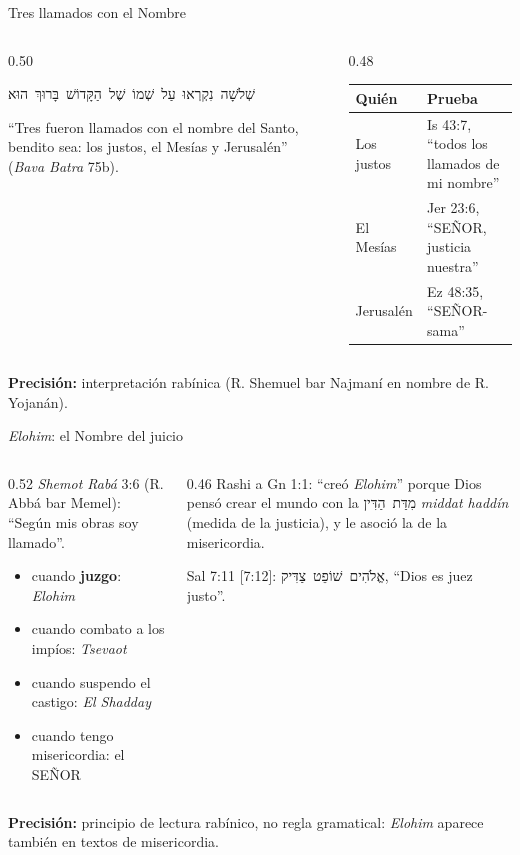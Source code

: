 \documentclass[hyperref={bookmarks=false},aspectratio=169]{beamer}
\newcommand{\heb}[1]{\mbox{\foreignlanguage{hebrew}{#1}}}
\newcommand{\SENOR}{S{\fontsize{0.78em}{1em}\selectfont EÑOR}}
\newcommand{\destacar}[1]{\textbf{\textcolor{azul}{#1}}}
\newcommand{\precision}[1]{{\footnotesize\color{gris}\textbf{Precisión:} #1}}
\begin{document}
\begin{frame}{Tres llamados con el Nombre}
\begin{columns}[c,onlytextwidth]
\begin{column}{0.50\textwidth}\small
\begin{center}\heb{שְׁלֹשָׁה נִקְרְאוּ עַל שְׁמוֹ שֶׁל הַקָּדוֹשׁ בָּרוּךְ הוּא}\end{center}
``Tres fueron llamados con el nombre del Santo, bendito sea: los justos, el Mesías y Jerusalén'' (\emph{Bava Batra} 75b).
\end{column}
\begin{column}{0.48\textwidth}
\scriptsize\renewcommand{\arraystretch}{1.2}
\begin{tabular}{@{}>{\RaggedRight\arraybackslash}p{1.6cm}>{\RaggedRight\arraybackslash}p{3.6cm}@{}}
\toprule
\textbf{Quién} & \textbf{Prueba} \\ \midrule
Los justos & Is 43:7, ``todos los llamados de mi nombre'' \\
El Mesías & Jer 23:6, ``\SENOR, justicia nuestra'' \\
Jerusalén & Ez 48:35, ``\SENOR-sama'' \\
\bottomrule
\end{tabular}
\end{column}
\end{columns}\par\medskip
\precision{interpretación rabínica (R. Shemuel bar Najmaní en nombre de R. Yojanán).}
\end{frame}

\begin{frame}{\emph{Elohim}: el Nombre del juicio}
\begin{columns}[c,onlytextwidth]
\begin{column}{0.52\textwidth}\small
\emph{Shemot Rabá} 3:6 (R. Abbá bar Memel): ``Según mis obras soy llamado''.
\begin{itemize}
\item cuando \destacar{juzgo}: \emph{Elohim}
\item cuando combato a los impíos: \emph{Tsevaot}
\item cuando suspendo el castigo: \emph{El Shadday}
\item cuando tengo misericordia: el \SENOR
\end{itemize}
\end{column}
\begin{column}{0.46\textwidth}\small
Rashi a Gn 1:1: ``creó \emph{Elohim}'' porque Dios pensó crear el mundo con la \heb{מִדַּת הַדִּין} \emph{middat haddín} (medida de la justicia), y le asoció la de la misericordia.\par\medskip
Sal 7:11 [7:12]: \heb{אֱלֹהִים שׁוֹפֵט צַדִּיק}, ``Dios es juez justo''.
\end{column}
\end{columns}\par\medskip
\precision{principio de lectura rabínico, no regla gramatical: \emph{Elohim} aparece también en textos de misericordia.}
\end{frame}
\end{document}
